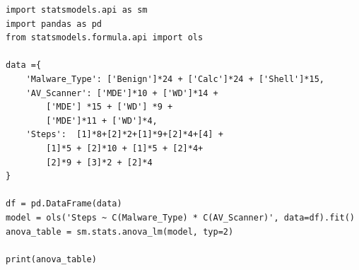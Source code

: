 \begin{listing}
    \begin{verbatim}
import statsmodels.api as sm
import pandas as pd
from statsmodels.formula.api import ols

data ={
    'Malware_Type': ['Benign']*24 + ['Calc']*24 + ['Shell']*15,
    'AV_Scanner': ['MDE']*10 + ['WD']*14 + 
        ['MDE'] *15 + ['WD'] *9 + 
        ['MDE']*11 + ['WD']*4,
    'Steps':  [1]*8+[2]*2+[1]*9+[2]*4+[4] + 
        [1]*5 + [2]*10 + [1]*5 + [2]*4+ 
        [2]*9 + [3]*2 + [2]*4
} 

df = pd.DataFrame(data)
model = ols('Steps ~ C(Malware_Type) * C(AV_Scanner)', data=df).fit()
anova_table = sm.stats.anova_lm(model, typ=2)

print(anova_table)
    \end{verbatim}
\end{listing}

